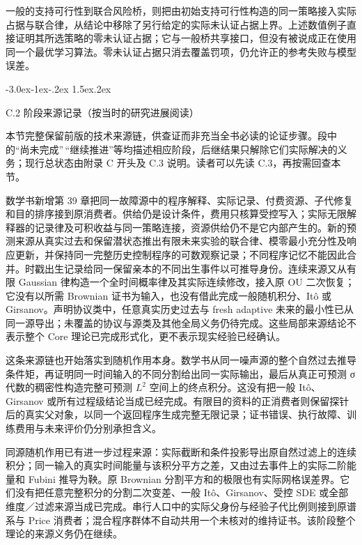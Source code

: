 \documentclass[
  11pt,
  oneside]{book}
\makeatletter
\renewcommand\section{\@startsection{section}{1}{\z@}%
  {-3.0ex\@plus-1ex\@minus-.2ex}%
  {1.5ex\@plus.2ex}%
  {\normalfont\Large\bfseries\raggedright\hyphenpenalty=10000\exhyphenpenalty=10000}}
\makeatother
\begin{document}
一般的支持可行性到联合风险桥，则把由初始支持可行性构造的同一策略接入实际占据与联合律，从结论中移除了另行给定的实际未认证占据上界。上述数值例子直接证明其所选策略的零未认证占据；它与一般桥共享接口，但没有被说成正在使用同一个最优学习算法。零未认证占据只消去覆盖罚项，仍允许正的参考失败与模型误差。

\section{C.2 阶段来源记录（按当时的研究进展阅读）}\label{ph-c-2}

本节完整保留前版的技术来源链，供查证而非充当全书必读的论证步骤。段中的``尚未完成''\,``继续推进''等均描述相应阶段，后继结果只解除它们实际解决的义务；现行总状态由附录 C 开头及 C.3 说明。读者可以先读 C.3，再按需回查本节。

数学书新增第 39 章把同一故障源中的程序解释、实际记录、付费资源、子代修复和目的排序接到原消费者。供给仍是设计条件，费用只核算受控写入；实际无限解释器的记录律及可积收益与同一策略连接，资源供给仍不是它内部产生的。新的预测来源从真实过去和保留潜状态推出有限未来实验的联合律、模零最小充分性及响应更新，并保持同一完整历史控制程序的可数观察记录；不同程序记忆不能因此合并。时戳出生记录给同一保留亲本的不同出生事件以可推导身份。连续来源又从有限 Gaussian 律构造一个全时间概率律及其实际连续修改，接入原 OU 二次恢复；它没有以所需 Brownian 证书为输入，也没有借此完成一般随机积分、Itô 或 Girsanov。声明协议类中，任意真实历史过去与 fresh adaptive 未来的最小性已从同一源导出；未覆盖的协议与源类及其他全局义务仍待完成。这些局部来源结论不表示整个 Core 理论已完成形式化，更不表示现实经验已经确认。

这条来源链也开始落实到随机作用本身。数学书从同一噪声源的整个自然过去推导条件矩，再证明同一时间输入的不同分割给出同一实际输出，最后从真正可预测 σ 代数的稠密性构造完整可预测 \(L^2\) 空间上的终点积分。这没有把一般 Itô、Girsanov 或所有过程级结论当成已经完成。有限目的资料的正消费者则保留探针后的真实父对象，以同一个返回程序生成完整无限记录；证书错误、执行故障、训练费用与未来评价仍分别承担含义。

同源随机作用已有进一步过程来源：实际截断和条件投影导出原自然过滤上的连续积分；同一输入的真实时间能量与该积分平方之差，又由过去事件上的实际二阶能量和 Fubini 推导为鞅。原 Brownian 分割平方和的极限也有实际网格误差界。它们没有把任意完整积分的分割二次变差、一般 Itô、Girsanov、受控 SDE 或全部维度／过滤来源当成已完成。串行人口中的实际父身份与经验子代比例则接到原谱系与 Price 消费者；混合程序群体不自动共用一个未核对的维持证书。该阶段整个理论的来源义务仍在继续。
\end{document}
